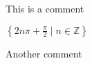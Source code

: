 \documentclass{article}
\begin{document}
This is a comment

\bigskip
$\left\{2 n \pi + \frac{\pi}{2}\; |\; n \in \mathbb{Z}\right\}$

\bigskip
Another comment
\end{document}
